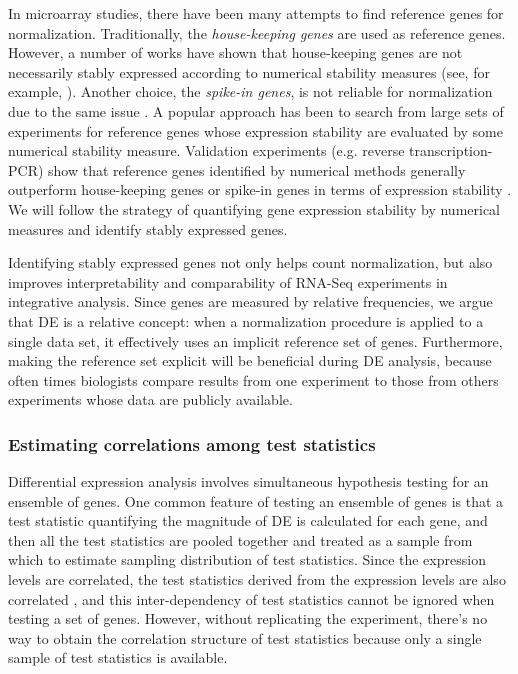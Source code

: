 In microarray studies, there have been many attempts to find reference genes for normalization.
Traditionally, the \textit{house-keeping genes}  are used as reference genes.
However, a number of works have shown that house-keeping genes are not necessarily stably expressed
according to numerical stability measures (see, for example,
\cite{czechowski2005genome,huggett2005real}). Another choice, the \textit{spike-in genes}, is not
reliable for normalization due to the same issue \citep{risso2014nat}. A popular approach has been
to search from large sets of experiments for reference genes
\citep{czechowski2005genome,dekkers2012identification,frericks2008toolbox,gur2009identification,stamova2009identification}
whose expression stability are evaluated by some numerical stability measure. Validation 
experiments (e.g. reverse
transcription-PCR) show that reference genes identified by numerical methods generally outperform 
house-keeping genes or spike-in genes in terms of expression stability 
\citep{czechowski2005genome,hruz2011refgenes}.
We will follow the strategy of quantifying gene expression stability by numerical measures and
identify stably expressed genes.

Identifying stably expressed genes not only helps count normalization, but also improves
interpretability and comparability of RNA-Seq experiments in integrative analysis. Since genes are
measured by relative frequencies, we argue that DE is a relative concept: when a normalization
procedure is applied to a single data set, it effectively uses an implicit reference set of genes.
Furthermore, making the reference set explicit will be beneficial during DE analysis, because often 
times biologists compare results from one experiment to those from others experiments whose data 
are publicly
available. 

\subsubsection{Estimating correlations among test statistics}
Differential expression analysis involves simultaneous hypothesis testing for an ensemble of genes. 
One common feature of testing an ensemble of genes is that a test statistic quantifying the 
magnitude of DE is 
calculated for each gene, and then all the test statistics are pooled together and treated as a 
sample from which to estimate sampling distribution of test statistics. Since the 
expression levels are correlated, the test statistics derived from the expression levels are 
also correlated , and this inter-dependency of test statistics cannot be ignored 
\citep{barry2008statistical, 
efron2007correlation, wu2012camera} when testing a set of genes. However, without  
replicating the experiment, there's no way to obtain the correlation structure of test 
statistics because only a single sample of test statistics is available. 

